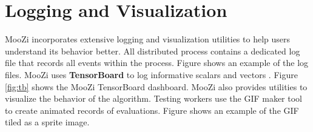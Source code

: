 \section{Logging and Visualization} \label{sec:logging}
MooZi incorporates extensive logging and visualization utilities to help users understand its behavior better.
All distributed process contains a dedicated log file that records all events within the process.
Figure  shows an example of the log files.
MooZi uses \textbf{TensorBoard} to log informative scalars and vectors \cite{TensorFlowLargeScaleMachine_Abadi.Agarwal.ea_}.
Figure \ref{fig:tb} shows the MooZi TensorBoard dashboard.
MooZi also provides utilities to visualize the behavior of the algorithm.
Testing workers use the GIF maker tool to create animated records of evaluations.
Figure  shows an example of the GIF tiled as a sprite image.

